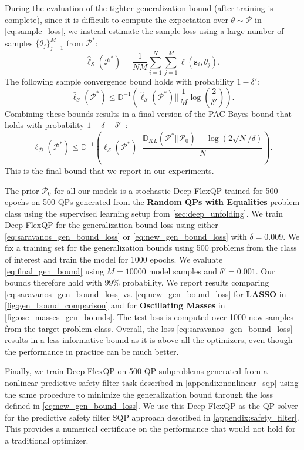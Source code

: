 \documentclass{article} %
\def\vs{{\bm{s}}}
\def\gD{{\mathcal{D}}}
\def\gP{{\mathcal{P}}}
\def\gS{{\mathcal{S}}}
\begin{document}
During the evaluation of the tighter generalization bound (after training is complete), since it is difficult to compute the expectation over $\theta \sim \gP$ in \cref{eq:sample_loss}, we instead estimate the sample loss using a large number of samples $\{\theta_j\}_{j=1}^M$ from $\gP^*$:
\begin{equation}
    \hat{\ell}_{\gS}(\gP^*) = \frac{1}{NM} \sum_{i = 1}^N \sum_{j = 1}^M \ell(\vs_i, \theta_j).
\end{equation}
The following sample convergence bound holds with probability $1 - \delta'$:
\begin{equation}
    \bar{\ell}_{\gS}(\gP^*) \leq \mathbb{D}^{-1}\left( \hat{\ell}_{\gS}(\gP^*) \lvert\rvert \frac{1}{M} \log(\frac{2}{\delta'}) \right).
\end{equation}
Combining these bounds results in a final version of the PAC-Bayes bound that holds with probability $1 - \delta - \delta'$~\citep{majumdar2021pac}:
\begin{equation}
    \ell_{\gD}(\gP^*) \leq \mathbb{D}^{-1}\left( \bar{\ell}_{\gS}(\gP^*) \lvert\rvert \frac{\mathbb{D}_{KL}(\gP^* \lvert\rvert \gP_0) + \log(2\sqrt{N} / \delta)}{N} \right). \label{eq:final_gen_bound}
\end{equation}
This is the final bound that we report in our experiments.

The prior $\gP_0$ for all our models is a stochastic Deep FlexQP trained for 500 epochs on 500 QPs generated from the \textbf{Random QPs with Equalities} problem class using the supervised learning setup from \cref{sec:deep_unfolding}. We train Deep FlexQP for the generalization bound loss using either \cref{eq:saravanos_gen_bound_loss} or \cref{eq:new_gen_bound_loss} with $\delta = 0.009$. We fix a training set for the generalization bounds using 500 problems from the class of interest and train the model for 1000 epochs. We evaluate \cref{eq:final_gen_bound} using $M = 10000$ model samples and $\delta' = 0.001$. Our bounds therefore hold with 99\% probability. We report results comparing \cref{eq:saravanos_gen_bound_loss} vs. \cref{eq:new_gen_bound_loss} for \textbf{LASSO} in \cref{fig:gen_bound_comparison} and for \textbf{Oscillating Masses} in \cref{fig:osc_masses_gen_bounds}. The test loss is computed over 1000 new samples from the target problem class. Overall, the loss \cref{eq:saravanos_gen_bound_loss} results in a less informative bound as it is above all the optimizers, even though the performance in practice can be much better.

Finally, we train Deep FlexQP on 500 QP subproblems generated from a nonlinear predictive safety filter task described in \cref{appendix:nonlinear_sqp} using the same procedure to minimize the generalization bound through the loss defined in \cref{eq:new_gen_bound_loss}. We use this Deep FlexQP as the QP solver for the predictive safety filter SQP approach described in \cref{appendix:safety_filter}. This provides a numerical certificate on the performance that would not hold for a traditional optimizer.
\end{document}
